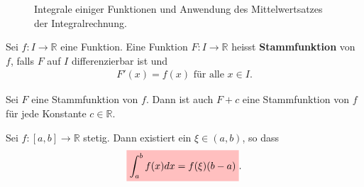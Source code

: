 \documentclass[12pt]{article}
\def\tick#1#2{\draw[thick] (#1) ++ (#2:0.09) --++ (#2-180:0.18)}
\newcommand{\R}{\mathbb{R}} %
\newenvironment{definition}[2][Definition]{\begin{trivlist}
        \item[\hskip \labelsep {\bfseries #1}\hskip \labelsep {\bfseries #2.}]}{\flushright{$\square$}\end{trivlist}}
\newenvironment{remark}[2][Bemerkung]{\begin{trivlist}
        \item[\hskip \labelsep {\bfseries #1}\hskip \labelsep {\bfseries #2.}]}{\end{trivlist}}
\begin{document}
\begin{figure}[htbp]
    \caption{Integrale einiger Funktionen und Anwendung des Mittelwertsatzes der Integralrechnung.}
\end{figure}

\begin{definition}{[Stammfunktion]}
    Sei $f: I \to \R$ eine Funktion. Eine Funktion $F: I \to \R$ heisst \textbf{Stammfunktion} von $f$, falls $F$ auf $I$ differenzierbar ist und
    \begin{align}
        F'(x)=f(x) \text{ für alle } x \in I.
    \end{align}

    \begin{remark}{[Viele Stammfunktionen]}
        Sei $F$ eine Stammfunktion von $f$. Dann ist auch $F+c$ eine Stammfunktion von $f$ für jede Konstante $c\in\R$.
    \end{remark}
\end{definition}

\begin{definition}{[Mittelwertsatz der Integralrechnung]}
    Sei $f: [a,b] \to \R$ stetig. Dann existiert ein $\xi \in (a,b)$, so dass
    \begin{align}
        \colorbox{pink}{\mathstrut$\displaystyle\int_{a}^{b}f(x)dx=f(\xi)(b-a)$}.
    \end{align}
\end{definition}
\end{document}
